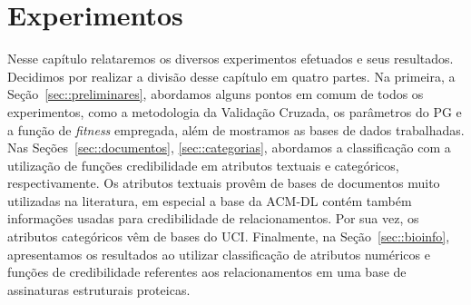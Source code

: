 \newcommand{\triangOK}{\textcolor[rgb]{00,0.45,0.10}{$\blacktriangle$}}
\newcommand{\triangBAD}{\textcolor[rgb]{0.7,00,00}{$\blacktriangledown$}}
\newcommand{\ball}{\textcolor[rgb]{0.7,0.70,0.0}{$\bullet$}}



\chapter{Experimentos}
\label{cap::experimentos}


Nesse capítulo relataremos os diversos experimentos efetuados e seus resultados.
Decidimos por realizar a divisão desse capítulo em quatro partes.
Na primeira, a Seção~\ref{sec::preliminares}, abordamos alguns pontos em comum de todos os experimentos, como a metodologia da Validação Cruzada, os parâmetros do \textsc{PG} e a função de \textit{fitness} empregada, além de mostramos as bases de dados trabalhadas.
Nas Seções~\ref{sec::documentos}, \ref{sec::categorias}, abordamos a classificação com a utilização de funções credibilidade em atributos textuais e categóricos, respectivamente.
Os atributos textuais provêm de bases de documentos muito utilizadas na literatura, em especial a base da \textsc{ACM-DL} contém também informações usadas para credibilidade de relacionamentos.
Por sua vez, os atributos categóricos vêm de bases do \textsc{UCI}.
Finalmente, na Seção~\ref{sec::bioinfo}, apresentamos os resultados ao utilizar classificação de atributos numéricos e funções de credibilidade referentes aos relacionamentos em uma base de assinaturas estruturais proteicas. 






